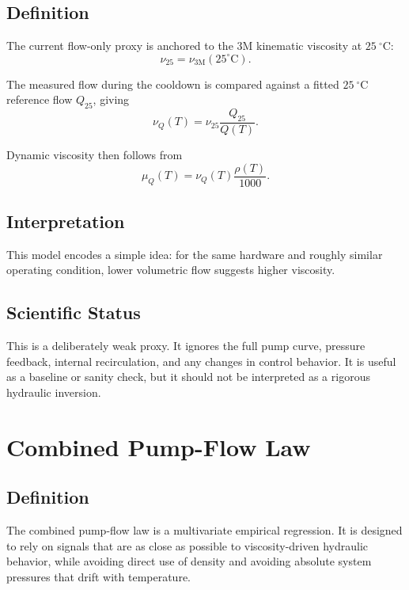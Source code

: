 \documentclass[11pt]{article}
\begin{document}
\subsection{Definition}

The current flow-only proxy is anchored to the 3M kinematic viscosity at
$25~^\circ\mathrm{C}$:
\begin{equation}
    \nu_{\mathrm{25}} = \nu_{\mathrm{3M}}(25^\circ\mathrm{C}).
\end{equation}

The measured flow during the cooldown is compared against a fitted
$25~^\circ\mathrm{C}$ reference flow $Q_{25}$, giving
\begin{equation}
    \nu_{Q}(T) = \nu_{\mathrm{25}} \frac{Q_{25}}{Q(T)}.
\end{equation}

Dynamic viscosity then follows from
\begin{equation}
    \mu_Q(T) = \nu_Q(T)\frac{\rho(T)}{1000}.
\end{equation}

\subsection{Interpretation}

This model encodes a simple idea: for the same hardware and roughly similar
operating condition, lower volumetric flow suggests higher viscosity.

\subsection{Scientific Status}

This is a deliberately weak proxy. It ignores the full pump curve, pressure
feedback, internal recirculation, and any changes in control behavior. It is
useful as a baseline or sanity check, but it should not be interpreted as a
rigorous hydraulic inversion.

\section{Combined Pump-Flow Law}

\subsection{Definition}

The combined pump-flow law is a multivariate empirical regression. It is
designed to rely on signals that are as close as possible to viscosity-driven
hydraulic behavior, while avoiding direct use of density and avoiding absolute
system pressures that drift with temperature.
\end{document}
